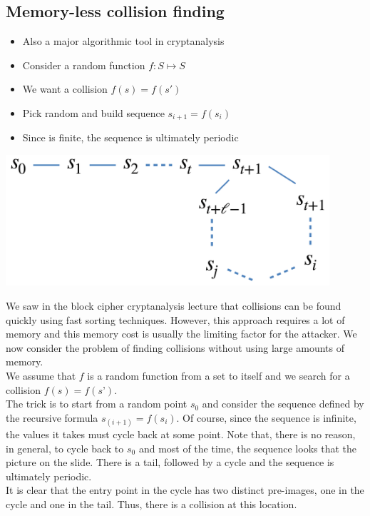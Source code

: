 	\subsection{Memory-less collision finding}
		\begin{itemize}
			\item Also a major algorithmic tool in cryptanalysis
			\item Consider a random function $f: S \mapsto S$
			\item We want a collision $f(s) = f(s')$
			\item Pick random and build sequence $s_{i+1} = f(s_i)$
			\item Since is finite, the sequence is ultimately periodic
		\end{itemize}
		\begin{center}
			\includegraphics[width=120mm]{Graphics/Hash Functions/hf17.png}
		\end{center}
		We saw in the block cipher cryptanalysis lecture that collisions can be found quickly using fast sorting techniques. 
		However, this approach requires a lot of memory and this memory cost is usually the limiting factor for the attacker. 
		We now consider the problem of finding collisions without using large amounts of memory.\\
		We assume that $f$ is a random function from a set to itself and we search for a collision $f(s)=f(s’)$.\\
		The trick is to start from a random point $s_0$ and consider the sequence defined by the recursive formula $s_(i+1)=f(s_i)$. 
		Of course, since the sequence is infinite, the values it takes must cycle back at some point. 
		Note that, there is no reason, in general, to cycle back to $s_0$ and most of the time, the sequence looks that the picture on the slide. 
		There is a tail, followed by a cycle and the sequence is ultimately periodic.\\
		It is clear that the entry point in the cycle has two distinct pre-images, one in the cycle and one in the tail. 
		Thus, there is a collision at this location.\\
